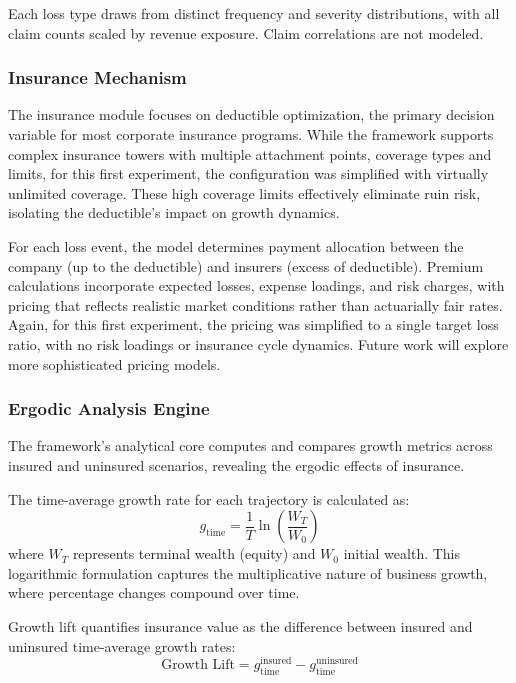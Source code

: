 \documentclass[11pt,letterpaper]{article}
\begin{document}
Each loss type draws from distinct frequency and severity distributions, with all claim counts scaled by revenue exposure. Claim correlations are not modeled.

\subsubsection{Insurance Mechanism}

The insurance module focuses on deductible optimization, the primary decision variable for most corporate insurance programs. While the framework supports complex insurance towers with multiple attachment points, coverage types and limits, for this first experiment, the configuration was simplified with virtually unlimited coverage. These high coverage limits effectively eliminate ruin risk, isolating the deductible's impact on growth dynamics.

For each loss event, the model determines payment allocation between the company (up to the deductible) and insurers (excess of deductible). Premium calculations incorporate expected losses, expense loadings, and risk charges, with pricing that reflects realistic market conditions rather than actuarially fair rates. Again, for this first experiment, the pricing was simplified to a single target loss ratio, with no risk loadings or insurance cycle dynamics. Future work will explore more sophisticated pricing models.

\subsubsection{Ergodic Analysis Engine}

The framework's analytical core computes and compares growth metrics across insured and uninsured scenarios, revealing the ergodic effects of insurance.

The time-average growth rate for each trajectory is calculated as:
\begin{equation}
g_{\text{time}} = \frac{1}{T} \ln\left(\frac{W_T}{W_0}\right)
\end{equation}
where $W_T$ represents terminal wealth (equity) and $W_0$ initial wealth. This logarithmic formulation captures the multiplicative nature of business growth, where percentage changes compound over time.

Growth lift quantifies insurance value as the difference between insured and uninsured time-average growth rates:
\begin{equation}
\text{Growth Lift} = g_{\text{time}}^{\text{insured}} - g_{\text{time}}^{\text{uninsured}}
\end{equation}
\end{document}
